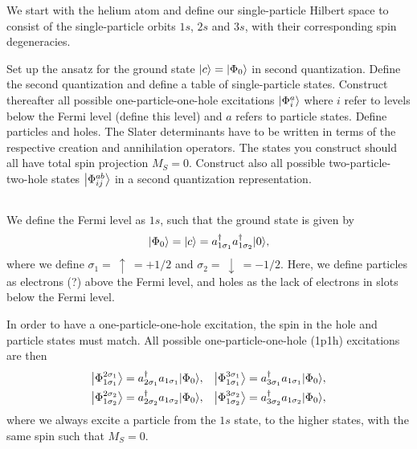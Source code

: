 We start with the helium atom and define our single-particle Hilbert
space to consist of the single-particle orbits \(1s\), \(2s\) and \(3s\),
with their corresponding spin degeneracies.

Set up the ansatz for the ground state \(\ket*{c} = \ket*{\Phi_0}\) in second quantization.
Define the second quantization and define a table of single-particle states.
Construct thereafter all possible one-particle-one-hole
excitations \(\ket*{\Phi_i^a}\) where \(i\) refer to levels below the Fermi level (define this level) and \(a\) refers to particle states.
Define particles and holes.
The Slater determinants have to be written in terms of the respective creation and annihilation operators.
The states you construct should all have total spin projection \(M_S=0\).
Construct also all possible two-particle-two-hole states \(\ket*{\Phi_{ij}^{ab}}\) in a second quantization
representation.

\subsection{}
We define the Fermi level as \(1s\), such that the ground state is given by
\begin{equation}
    \ket*{\Phi_0} = \ket*{c} = a_{1\sigma_1}^\dagger a_{1\sigma_2}^\dagger \ket*{0},
\end{equation}
where we define $\sigma_1 = \ \uparrow \ = +1/2$ and $\sigma_2 = \ \downarrow \ = -1/2$.
Here, we define particles as electrons (?) above the Fermi level, and holes as the lack of electrons in slots below the Fermi level.

In order to have a one-particle-one-hole excitation, the spin in the hole and particle states must match.
All possible one-particle-one-hole (1p1h) excitations are then
\begin{align*}
    \ket*{\Phi_{1\sigma_1}^{2\sigma_1}} &= a_{2\sigma_1}^\dagger a_{1\sigma_1} \ket*{\Phi_0}, &
    \ket*{\Phi_{1\sigma_1}^{3\sigma_1}} &= a_{3\sigma_1}^\dagger a_{1\sigma_1} \ket*{\Phi_0}, \\
    \ket*{\Phi_{1\sigma_2}^{2\sigma_2}} &= a_{2\sigma_2}^\dagger a_{1\sigma_2} \ket*{\Phi_0}, &
    \ket*{\Phi_{1\sigma_2}^{3\sigma_2}} &= a_{3\sigma_2}^\dagger a_{1\sigma_2} \ket*{\Phi_0},
\end{align*}
where we always excite a particle from the $1s$ state, to the higher states, with the same spin such that $M_S = 0$.

